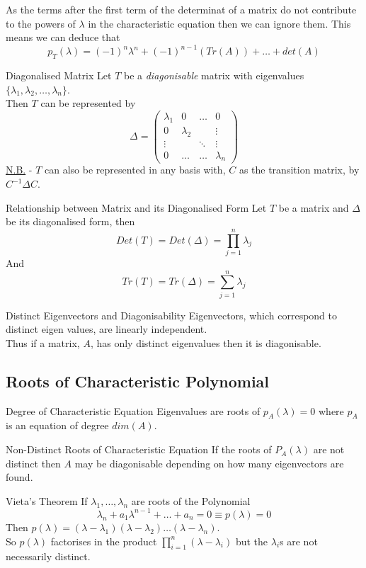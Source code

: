 \documentclass[11pt,a4paper]{article}
\begin{document}
\subtitle{Remark 8.11}{}
As the terms after the first term of the determinat of a matrix do not contribute to the powers of $\lambda$ in the characteristic equation then we can ignore them.
This means we can deduce that
$$p_T(\lambda) = (-1)^n\lambda^n + (-1)^{n-1}(Tr(A)) + \dots + det(A)$$

\subtitle{Theorem 8.12 - }{Diagonalised Matrix}
Let $T$ be a \textit{diagonisable} matrix with eigenvalues $\{\lambda_1, \lambda_2, \dots , \lambda_n\}$.\\
Then $T$ can be represented by $$\Delta = \begin{pmatrix} \lambda_1 & 0  & \dots & 0\\ 0 & \lambda_2 & & \vdots \\ \vdots & & \ddots & \vdots \\ 0 & \dots & \dots & \lambda_n \end{pmatrix}$$
\underline{N.B.} - $T$ can also be represented in any basis with, $C$ as the transition matrix, by $C^{-1}\Delta C$.\\

\subtitle{Theorem 8.13 - }{Relationship between Matrix and its Diagonalised Form}
Let $T$ be a matrix and $\Delta$ be its diagonalised form, then
$$Det(T) = Det(\Delta) = \prod_{j=1}^n \lambda_j$$
And $$Tr(T) = Tr(\Delta) = \sum_{j=1}^n \lambda_j$$

\subtitle{Theorem 8.14 - }{Distinct Eigenvectors and Diagonisability}
Eigenvectors, which correspond to distinct eigen values, are linearly independent.\\
Thus if a matrix, $A$, has only distinct eigenvalues then it is diagonisable.

\subsection{Roots of Characteristic Polynomial}

\subtitle{Remark 8.15 - }{Degree of Characteristic Equation}
Eigenvalues are roots of $p_A(\lambda) = 0$ where $p_A$ is an equation of degree $dim(A)$.\\

\subtitle{Remark 8.16 - }{Non-Distinct Roots of Characteristic Equation}
If the roots of $P_A(\lambda)$ are not distinct then $A$ may be diagonisable depending on how many eigenvectors are found.\\

\subtitle{Theorem 8.17 - }{Vieta's Theorem}
If $\lambda_1 , \dots , \lambda_n$ are roots of the Polynomial
$$\lambda_n + a_1\lambda^{n-1} + \dots + a_n = 0 \equiv p(\lambda) = 0$$
Then $p(\lambda) = (\lambda-\lambda_1)(\lambda - \lambda_2) \dots (\lambda - \lambda_n)$.\\
So $p(\lambda)$ factorises in the product $\prod_{i=1}^{n}(\lambda - \lambda_i)$ but the $\lambda_i$s are not necessarily distinct.\\
\end{document}

